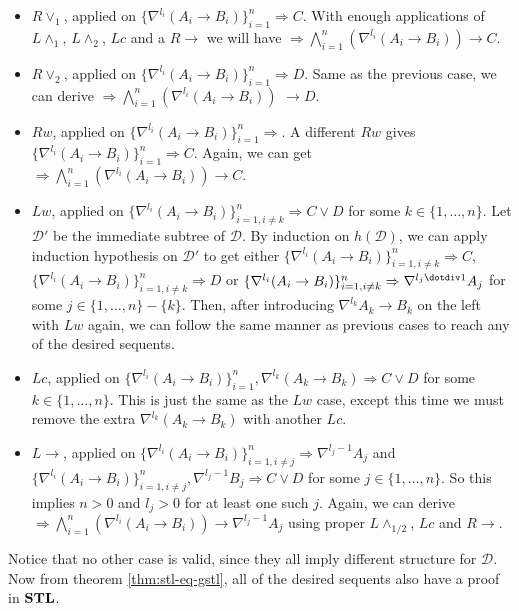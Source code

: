 \begin{itemize}[label=-]
	\item $R\lor_1$, applied on $\{ \nabla^{l_i} (A_i \rightarrow B_i) \}_{i=1}^n \Rightarrow C$. With enough applications of $L\land_1$, $L\land_2$, $Lc$ and a $R\rightarrow$ we will have $\Rightarrow \bigwedge_{i=1}^n (\nabla^{l_i} (A_i \rightarrow B_i)) \rightarrow C$.
	
	\item $R\lor_2$, applied on $\{ \nabla^{l_i} (A_i \rightarrow B_i) \}_{i=1}^n \Rightarrow D$. Same as the previous case, we can derive $\Rightarrow \bigwedge_{i=1}^n (\nabla^{l_i} (A_i \rightarrow B_i)) $ $\rightarrow D$.
	
	\item $Rw$, applied on $\{ \nabla^{l_i} (A_i \rightarrow B_i) \}_{i=1}^n \Rightarrow$. A different $Rw$ gives $\{ \nabla^{l_i} (A_i \rightarrow B_i) \}_{i=1}^n \Rightarrow C$. Again, we can get $\Rightarrow \bigwedge_{i=1}^n (\nabla^{l_i} (A_i \rightarrow B_i)) \rightarrow C$.
	
	\item $Lw$, applied on $\{ \nabla^{l_i} (A_i \rightarrow B_i) \}_{i=1,i \neq k}^n \Rightarrow C \lor D$ for some $k \in \{ 1 , \dots , n \}$. Let $\mathcal{D}'$ be the immediate subtree of $\mathcal{D}$. By induction on $h(\mathcal{D})$, we can apply induction hypothesis on $\mathcal{D}'$ to get either $\{ \nabla^{l_i} (A_i \rightarrow B_i) \}_{i=1,i \neq k}^n \Rightarrow C$, $\{ \nabla^{l_i} (A_i \rightarrow B_i) \}_{i=1,i \neq k}^n \Rightarrow D$ or $\{ \nabla^{l_i} (A_i \rightarrow B_i) \}_{i=1,i \neq k}^n \Rightarrow \nabla^{l_j \dotdiv 1} A_j$ for some $j \in \{ 1 , \dots , n \} - \{k\}$. Then, after introducing $\nabla^{l_k} A_k \rightarrow B_k$ on the left with $Lw$ again, we can follow the same manner as previous cases to reach any of the desired sequents.
	
	\item $Lc$, applied on $\{ \nabla^{l_i} (A_i \rightarrow B_i) \}_{i=1}^n , \nabla^{l_k} (A_k \rightarrow B_k) \Rightarrow C \lor D$ for some $k \in \{ 1 , \dots , n \}$. This is just the same as the $Lw$ case, except this time we must remove the extra $\nabla^{l_k} (A_k \rightarrow B_k)$ with another $Lc$.
	
	\item $L\rightarrow$, applied on $\{ \nabla^{l_i} (A_i \rightarrow B_i) \}_{i=1, i \neq j}^n \Rightarrow \nabla^{l_j - 1} A_j$ and $\{ \nabla^{l_i} (A_i \rightarrow B_i) \}_{i=1, i \neq j}^n , \nabla^{l_j - 1} B_j \Rightarrow C \lor D$ for some $j \in \{ 1 , \dots , n \}$. So this implies $n>0$ and $l_j>0$ for at least one such $j$. Again, we can derive $\Rightarrow  \bigwedge_{i=1}^n (\nabla^{l_i} (A_i \rightarrow B_i)) \rightarrow \nabla^{l_j - 1} A_j$ using proper $L\land_{1/2}$, $Lc$ and $R\rightarrow$.
\end{itemize}
Notice that no other case is valid, since they all imply different structure for $\mathcal{D}$. Now from theorem \ref{thm:stl-eq-gstl}, all of the desired sequents also have a proof in $\mathbf{STL}$.

